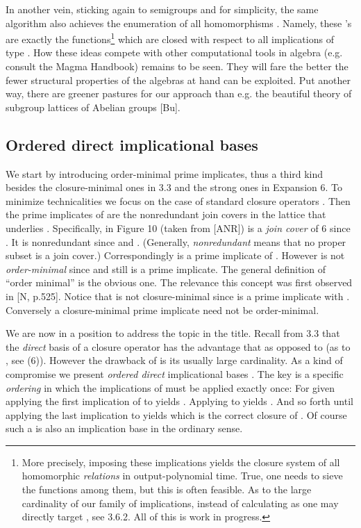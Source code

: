 \documentclass[11pt]{article}
\begin{document}
In another vein, sticking again to semigroups  and  for simplicity, the same algorithm also achieves the enumeration of all homomorphisms . Namely, these 's are exactly the functions\footnote{More precisely, imposing these  implications yields the closure system  of all homomorphic {\it relations}  in output-polynomial time.  True, one needs to sieve the functions among them, but this is often feasible. As to the large cardinality  of our family  of implications, instead of calculating  as  one may directly target , see 3.6.2. All of this is work in progress.}   which are closed with respect to all  implications of type . How these ideas compete with other computational tools in algebra (e.g. consult the Magma Handbook) remains to be seen. They will fare the better the fewer structural properties of the algebras at hand can be exploited. Put another way, there are greener pastures for our approach than e.g. the beautiful theory of subgroup lattices of Abelian groups [Bu].  

 
\subsection{Ordered direct implicational bases}

We start by introducing order-minimal prime implicates, thus a third kind besides the closure-minimal ones in 3.3 and the strong ones in Expansion 6. To minimize technicalities we focus on the case of standard closure operators . Then the prime implicates of  are the nonredundant join covers in the lattice  that underlies . Specifically,  in Figure 10 (taken from [ANR]) is a {\it join cover} of 6 since . It is nonredundant since  and . (Generally,  {\it nonredundant} means that no proper subset is  a join cover.) Correspondingly  is a prime implicate of . However  is not {\it order-minimal} since  and still  is a prime implicate. The general definition of ``order minimal'' is the obvious one. The relevance this concept was first observed in [N, p.525]. Notice that  is not closure-minimal since  is a prime implicate with . Conversely a closure-minimal prime implicate need not be order-minimal.

We are now in a position to address the topic in the title.
Recall from 3.3 that the {\it direct} basis  of a closure operator  has the advantage that  as opposed to  (as to , see (6)). However the drawback of  is its usually large cardinality. As a kind of compromise we present {\it ordered direct} implicational bases . The key is a specific {\it ordering} in which the implications of  must be applied exactly once: For given  applying the first implication  of  to  yields . Applying  to  yields . And so forth until applying the last implication  to  yields  which is the correct closure of . Of course such a  is also an implication base in the ordinary sense.
\end{document}
